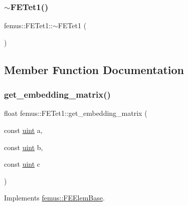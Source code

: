 \mbox{\label{classfemus_1_1_f_e_tet1_abde5b1fc0495f3d49ccdfe951ac2bc20}} 
\subsubsection{\texorpdfstring{$\sim$\+F\+E\+Tet1()}{~FETet1()}}
{\footnotesize\ttfamily femus\+::\+F\+E\+Tet1\+::$\sim$\+F\+E\+Tet1 (\begin{DoxyParamCaption}{ }\end{DoxyParamCaption})}



\subsection{Member Function Documentation}
\mbox{\label{classfemus_1_1_f_e_tet1_a2963e6669725e8df2e98c30c1c82f91d}} 
\subsubsection{\texorpdfstring{get\+\_\+embedding\+\_\+matrix()}{get\_embedding\_matrix()}}
{\footnotesize\ttfamily float femus\+::\+F\+E\+Tet1\+::get\+\_\+embedding\+\_\+matrix (\begin{DoxyParamCaption}\item[{const \mbox{\hyperlink{_typedefs_8hpp_a91ad9478d81a7aaf2593e8d9c3d06a14}{uint}}}]{a,  }\item[{const \mbox{\hyperlink{_typedefs_8hpp_a91ad9478d81a7aaf2593e8d9c3d06a14}{uint}}}]{b,  }\item[{const \mbox{\hyperlink{_typedefs_8hpp_a91ad9478d81a7aaf2593e8d9c3d06a14}{uint}}}]{c }\end{DoxyParamCaption})\hspace{0.3cm}{\ttfamily [virtual]}}



Implements \mbox{\hyperlink{classfemus_1_1_f_e_elem_base_a0c4d6d5ec66bd4e301eb8ea2ef10f354}{femus\+::\+F\+E\+Elem\+Base}}.

